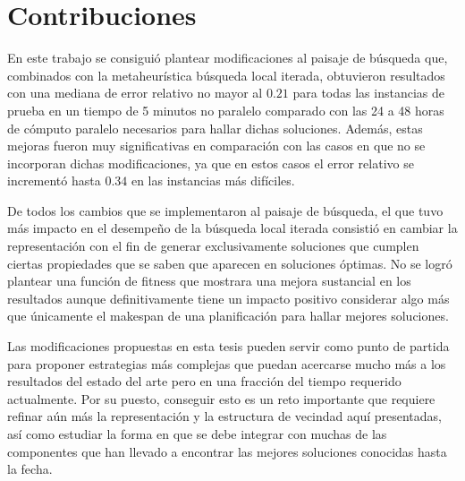 \section{Contribuciones}
En este trabajo se consiguió plantear modificaciones al paisaje de búsqueda que, combinados con la metaheurística búsqueda local iterada, obtuvieron resultados 
con una mediana de error relativo no mayor al $0.21$ para todas las instancias de prueba en un tiempo de 5 minutos no paralelo comparado con las 24 a 48 horas 
de cómputo paralelo necesarios para hallar dichas soluciones.
%
Además, estas mejoras fueron muy significativas en comparación con las casos en que no se incorporan dichas modificaciones, ya que en estos casos el error
relativo se incrementó hasta $0.34$ en las instancias más difíciles.

De todos los cambios que se implementaron al paisaje de búsqueda, el que tuvo más impacto en el desempeño de la búsqueda local iterada consistió en cambiar 
la representación con el fin de generar exclusivamente soluciones que cumplen ciertas propiedades que se saben que aparecen en soluciones óptimas.
%
No se logró plantear una función de fitness que mostrara una mejora sustancial en los resultados aunque definitivamente tiene un impacto positivo considerar 
algo más que únicamente el makespan de una planificación para hallar mejores soluciones.

Las modificaciones propuestas en esta tesis pueden servir como punto de partida para proponer estrategias más complejas que puedan acercarse mucho más a los 
resultados del estado del arte pero en una fracción del tiempo requerido actualmente. 
%
Por su puesto, conseguir esto es un reto importante que requiere refinar aún más la representación y la estructura de vecindad aquí presentadas, así como
estudiar la forma en que se debe integrar con muchas de las componentes que han llevado a encontrar las mejores soluciones conocidas hasta la fecha.


